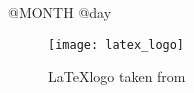 \documentclass[11pt,a4paper]{article}
\begin{document}
{\Huge @MONTH @day}

\begin{figure}[!t]
    \texttt{[image: latex\_logo]}
    \caption{\LaTeX logo taken from \cite{wikipedia}}
\end{figure}



\end{document}
